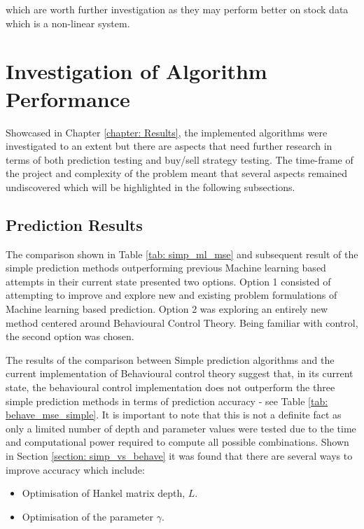 \noindent which are worth further investigation as they may perform better on stock data which is a non-linear system.

\section{Investigation of Algorithm Performance}

Showcased in Chapter \ref{chapter: Results}, the implemented algorithms were investigated to an extent but there are aspects that need further research in terms of both prediction testing and buy/sell strategy testing. The time-frame of the project and complexity of the problem meant that several aspects remained undiscovered which will be highlighted in the following subsections. 

\subsection{Prediction Results}

 The comparison shown in Table \ref{tab: simp_ml_mse} and subsequent result of the simple prediction methods outperforming previous Machine learning based attempts \cite{ml_paper} in their current state presented two options. Option 1 consisted of attempting to improve and explore new and existing problem formulations of Machine learning based prediction. Option 2 was exploring an entirely new method centered around Behavioural Control Theory. Being familiar with control, the second option was chosen. 

\noindent The results of the comparison between Simple prediction algorithms and the current implementation of Behavioural control theory suggest that, in its current state, the behavioural control implementation does not outperform the three simple prediction methods in terms of prediction accuracy - see Table \ref{tab: behave_mse_simple}. It is important to note that this is not a definite fact as only a limited number of depth and parameter values were tested due to the time and computational power required to compute all possible combinations. Shown in Section \ref{section: simp_vs_behave} it was found that there are several ways to improve accuracy which include:

\begin{itemize}
    \item Optimisation of Hankel matrix depth, $L$.
    \item Optimisation of the parameter $\gamma$.
\end{itemize}

